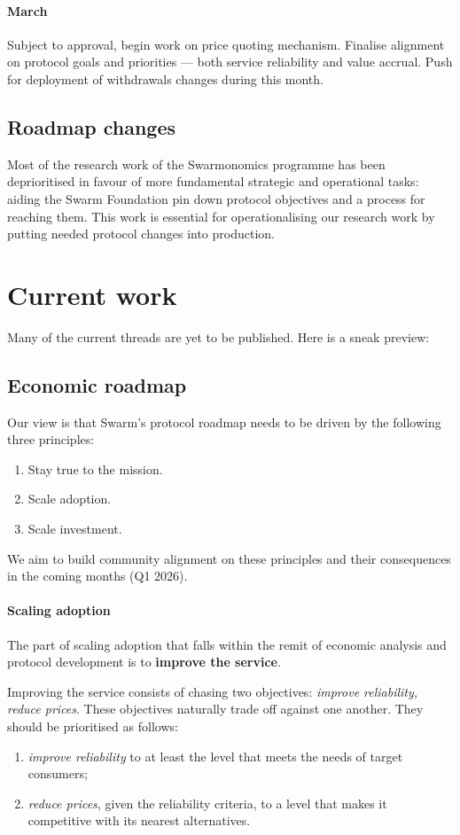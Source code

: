 \paragraph{March}
%
Subject to approval, begin work on price quoting mechanism.
%
Finalise alignment on protocol goals and priorities — both service reliability and value accrual.
%
Push for deployment of withdrawals changes during this month.

\subsection*{Roadmap changes}

Most of the research work of the Swarmonomics programme has been deprioritised in favour of more fundamental strategic and operational tasks: aiding the Swarm Foundation pin down protocol objectives and a process for reaching them.
%
This work is essential for operationalising our research work by putting needed protocol changes into production.

\section*{Current work}

Many of the current threads are yet to be published.
%
Here is a sneak preview:

\subsection*{Economic roadmap}

Our view is that Swarm's protocol roadmap needs to be driven by the following three principles:
%
\begin{enumerate}
  \item Stay true to the mission.
  \item Scale adoption.
  \item Scale investment.
\end{enumerate}
%
We aim to build community alignment on these principles and their consequences in the coming months (Q1 2026).

\paragraph{Scaling adoption} The part of scaling adoption that falls within the remit of economic analysis and protocol development is to \textbf{improve the service}.

Improving the service consists of chasing two objectives: \emph{improve reliability, reduce prices}.
%
These objectives naturally trade off against one another.
%
They should be prioritised as follows:
%
\begin{enumerate}
  \item \emph{improve reliability} to at least the level that meets the needs of target consumers;
  \item \emph{reduce prices}, given the reliability criteria, to a level that makes it competitive with its nearest alternatives.
\end{enumerate}

